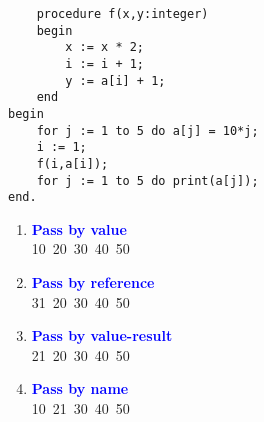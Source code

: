\documentclass[11pt]{article}
\begin{document}
\begin{enumerate}
\begin{verbatim}
    procedure f(x,y:integer)
    begin
        x := x * 2;
        i := i + 1;
        y := a[i] + 1;
    end
begin
    for j := 1 to 5 do a[j] = 10*j;
    i := 1;
    f(i,a[i]);
    for j := 1 to 5 do print(a[j]);
end.
\end{verbatim}
    \begin{enumerate}
    \item \textbf{\textcolor{blue}{Pass by value}}
    \\ 10\ 20\ 30\ 40\ 50
    \item \textbf{\textcolor{blue}{Pass by reference}}
    \\ 31\ 20\ 30\ 40\ 50
    \item \textbf{\textcolor{blue}{Pass by value-result}}
    \\ 21\ 20\ 30\ 40\ 50
    \item \textbf{\textcolor{blue}{Pass by name}}
    \\ 10\ 21\ 30\ 40\ 50
    \end{enumerate}
    
\end{enumerate}
\end{document}
